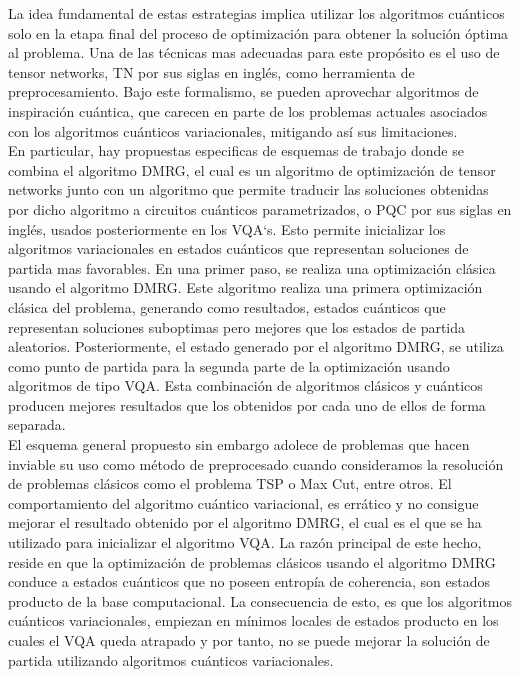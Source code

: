 \newpage

La idea fundamental de estas estrategias implica utilizar los algoritmos cuánticos solo en la etapa final del proceso de optimización para obtener la solución óptima al problema. Una de las técnicas mas adecuadas para este propósito es el uso de tensor networks, TN por sus siglas en inglés, como herramienta de preprocesamiento. Bajo este formalismo, se pueden aprovechar algoritmos de inspiración cuántica, que carecen en parte de los problemas actuales asociados con los algoritmos cuánticos variacionales, mitigando así sus limitaciones. \\

En particular, hay propuestas especificas de esquemas de trabajo donde se combina el algoritmo DMRG, el cual es un algoritmo de optimización de tensor networks junto con un algoritmo que permite traducir las soluciones obtenidas por dicho algoritmo a circuitos cuánticos parametrizados, o PQC por sus siglas en inglés, usados posteriormente en los VQA`s. Esto permite inicializar los algoritmos variacionales en estados cuánticos que representan soluciones de partida mas favorables. En una primer paso, se realiza una optimización clásica usando el algoritmo DMRG. Este algoritmo realiza una primera optimización clásica del problema, generando como resultados, estados cuánticos que representan soluciones suboptimas pero mejores que los estados de partida aleatorios. Posteriormente, el estado generado por el algoritmo DMRG, se utiliza como punto de partida para la segunda parte de la optimización usando algoritmos de tipo VQA. Esta combinación de algoritmos clásicos y cuánticos producen mejores resultados que los obtenidos por cada uno de ellos de forma separada. \\

El esquema general propuesto sin embargo adolece de problemas que hacen inviable su uso como método de preprocesado cuando consideramos la resolución de problemas clásicos como el problema TSP o Max Cut, entre otros. El comportamiento del algoritmo cuántico variacional, es errático y no consigue mejorar el resultado obtenido por el algoritmo DMRG, el cual es el que se ha utilizado para inicializar el algoritmo VQA. La razón principal de este hecho, reside en que la optimización de problemas clásicos usando el algoritmo DMRG conduce a estados cuánticos que no poseen entropía de coherencia, son estados producto de la base computacional. La consecuencia de esto, es que los algoritmos cuánticos variacionales, empiezan en mínimos locales de estados producto en los cuales el VQA queda atrapado y por tanto, no se puede mejorar la solución de partida utilizando algoritmos cuánticos variacionales. 

